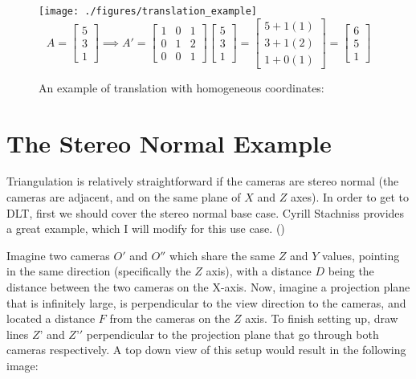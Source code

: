 \documentclass[12pt,twoside]{reedthesis}
\begin{document}
\begin{figure}[h]
	   
	       \centering
	    
	    \texttt{[image: ./figures/translation\_example]}
	    \[A = \begin{bmatrix}5\\3\\1\end{bmatrix} \implies A' = \begin{bmatrix}1&0&1\\0&1&2\\0&0&1\end{bmatrix}\begin{bmatrix}5\\3\\1\end{bmatrix} = \begin{bmatrix}5 + 1(1)\\3 + 1(2)\\1 + 0(1)\end{bmatrix}= \begin{bmatrix}6\\5\\1\end{bmatrix}
	    \]
	    \caption{An example of translation with homogeneous coordinates:}
	 \label{Translation Example}
	\end{figure}
	
\section{The Stereo Normal Example}

Triangulation is relatively straightforward if the cameras are stereo normal (the cameras are adjacent, and on the same plane of $X$ and $Z$ axes). In order to get to DLT, first we should cover the stereo normal base case. Cyrill Stachniss provides a great example, which I will modify for this use case. (\cite{stachniss_lecture_2021})

	Imagine two cameras $O'$ and $O''$ which share the same $Z$ and $Y$ values, pointing in the same direction (specifically the $Z$ axis), with a distance $D$ being the distance between the two cameras on the X-axis. Now, imagine a projection plane that is infinitely large, is perpendicular to the view direction to the cameras, and located a distance $F$ from the cameras on the $Z$ axis. To finish setting up, draw lines $Z’$ and $Z’'$ perpendicular to the projection plane that go through both cameras respectively. A top down view of this setup would result in the following image: 
	
\end{document}
